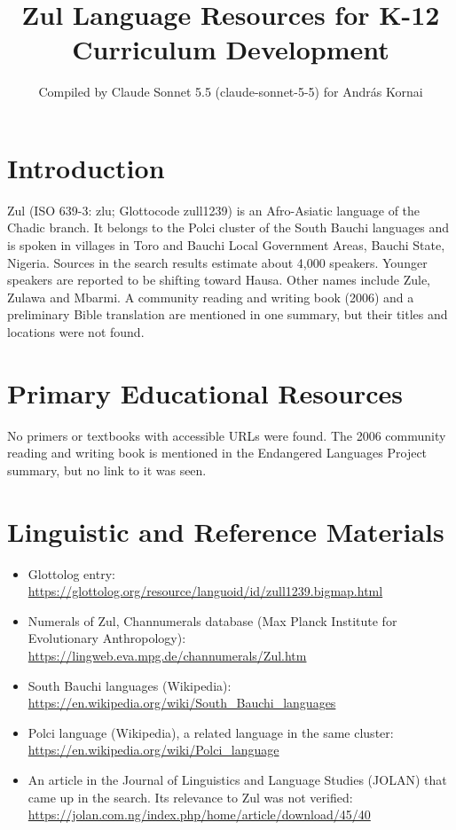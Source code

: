 \documentclass[12pt]{article}
\title{Zul Language Resources for K-12 Curriculum Development}
\author{Compiled by Claude Sonnet 5.5 (claude-sonnet-5-5) for Andr\'as Kornai}
\date{}
\begin{document}
\maketitle

\section{Introduction}
Zul (ISO 639-3: zlu; Glottocode zull1239) is an Afro-Asiatic language of the Chadic branch. It belongs to the Polci cluster of the South Bauchi languages and is spoken in villages in Toro and Bauchi Local Government Areas, Bauchi State, Nigeria. Sources in the search results estimate about 4,000 speakers. Younger speakers are reported to be shifting toward Hausa. Other names include Zule, Zulawa and Mbarmi. A community reading and writing book (2006) and a preliminary Bible translation are mentioned in one summary, but their titles and locations were not found.

\section{Primary Educational Resources}
No primers or textbooks with accessible URLs were found. The 2006 community reading and writing book is mentioned in the Endangered Languages Project summary, but no link to it was seen.

\section{Linguistic and Reference Materials}
\begin{itemize}
\item Glottolog entry: \url{https://glottolog.org/resource/languoid/id/zull1239.bigmap.html}
\item Numerals of Zul, Channumerals database (Max Planck Institute for Evolutionary Anthropology): \url{https://lingweb.eva.mpg.de/channumerals/Zul.htm}
\item South Bauchi languages (Wikipedia): \url{https://en.wikipedia.org/wiki/South_Bauchi_languages}
\item Polci language (Wikipedia), a related language in the same cluster: \url{https://en.wikipedia.org/wiki/Polci_language}
\item An article in the Journal of Linguistics and Language Studies (JOLAN) that came up in the search. Its relevance to Zul was not verified: \url{https://jolan.com.ng/index.php/home/article/download/45/40}
\end{itemize}
\end{document}
